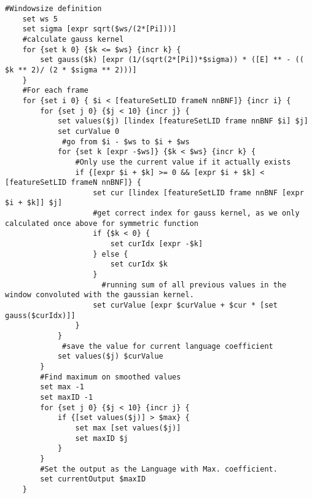 \begin{lstlisting}[label=lst:tclGauss,caption=Gaussian Smoothing Filter as implemented in tcl/tk for the JRTk]
    #Windowsize definition
    set ws 5
    set sigma [expr sqrt($ws/(2*[Pi]))]
    #calculate gauss kernel
    for {set k 0} {$k <= $ws} {incr k} {
        set gauss($k) [expr (1/(sqrt(2*[Pi])*$sigma)) * ([E] ** - (( $k ** 2)/ (2 * $sigma ** 2)))]
    }
    #For each frame
    for {set i 0} { $i < [featureSetLID frameN nnBNF]} {incr i} {
        for {set j 0} {$j < 10} {incr j} {
            set values($j) [lindex [featureSetLID frame nnBNF $i] $j]
            set curValue 0
	         #go from $i - $ws to $i + $ws
            for {set k [expr -$ws]} {$k < $ws} {incr k} {
                #Only use the current value if it actually exists
                if {[expr $i + $k] >= 0 && [expr $i + $k] < [featureSetLID frameN nnBNF]} {
                    set cur [lindex [featureSetLID frame nnBNF [expr $i + $k]] $j]
                    #get correct index for gauss kernel, as we only calculated once above for symmetric function
                    if {$k < 0} {
                        set curIdx [expr -$k]
                    } else {
                        set curIdx $k
                    }
		              #running sum of all previous values in the window convoluted with the gaussian kernel.
                    set curValue [expr $curValue + $cur * [set gauss($curIdx)]]
                }
            }
	         #save the value for current language coefficient
            set values($j) $curValue
        }
        #Find maximum on smoothed values
        set max -1
        set maxID -1
        for {set j 0} {$j < 10} {incr j} {
            if {[set values($j)] > $max} {
                set max [set values($j)]
                set maxID $j
            }
        }
        #Set the output as the Language with Max. coefficient.
        set currentOutput $maxID
    }
\end{lstlisting}

